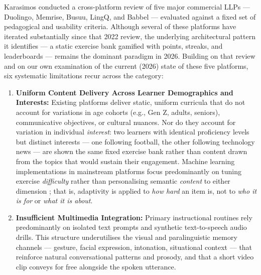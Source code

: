     Karasimos \cite{karasimos2022battle} conducted a cross-platform review of five major commercial LLPs --- Duolingo, Memrise, Busuu, LingQ, and Babbel --- evaluated against a fixed set of pedagogical and usability criteria. Although several of these platforms have iterated substantially since that 2022 review, the underlying architectural pattern it identifies --- a static exercise bank gamified with points, streaks, and leaderboards --- remains the dominant paradigm in 2026. Building on that review and on our own examination of the current (2026) state of these five platforms, six systematic limitations recur across the category:

    \begin{enumerate}
        \item \textbf{Uniform Content Delivery Across Learner Demographics and Interests:} Existing platforms deliver static, uniform curricula that do not account for variations in age cohorts (e.g., Gen Z, adults, seniors), communicative objectives, or cultural nuances. Nor do they account for variation in individual \emph{interest}: two learners with identical proficiency levels but distinct interests --- one following football, the other following technology news --- are shown the same fixed exercise bank rather than content drawn from the topics that would sustain their engagement. Machine learning implementations in mainstream platforms focus predominantly on tuning exercise \emph{difficulty} rather than personalising semantic \emph{content} to either dimension \cite{businessresearch2026languageapps}; that is, adaptivity is applied to \emph{how hard} an item is, not to \emph{who it is for} or \emph{what it is about}.

        \item \textbf{Insufficient Multimedia Integration:} Primary instructional routines rely predominantly on isolated text prompts and synthetic text-to-speech audio drills. This structure underutilises the visual and paralinguistic memory channels --- gesture, facial expression, intonation, situational context --- that reinforce natural conversational patterns and prosody, and that a short video clip conveys for free alongside the spoken utterance.


\end{enumerate}
